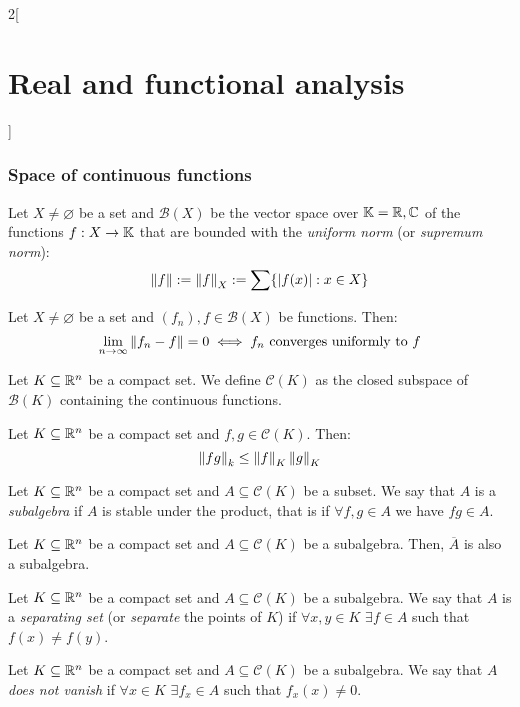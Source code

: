 \documentclass[../../../main_math.tex]{subfiles}
\begin{document}
\begin{multicols}{2}[\section{Real and functional analysis}]
  \subsubsection{Space of continuous functions}
  \begin{definition}
    Let $X\ne \varnothing$ be a set and $\mathcal{B}(X)$ be the vector space over $\mathbb{K}=\mathbb{R},\mathbb{C}$ of the functions $f:X\rightarrow\mathbb{K}$ that are bounded with the \emph{uniform norm} (or \emph{supremum norm}): $$\left\|f\right\|:=\left\|f\right\|_X:=\sum\{\abs{f(x)}:x\in X\}$$
  \end{definition}
  \begin{proposition}
    Let $X\ne \varnothing$ be a set and $(f_n),f\in\mathcal{B}(X)$ be functions. Then: $$\lim_{n\to\infty}\left\|f_n-f\right\|=0\iff f_n\text{ converges uniformly to }f$$
  \end{proposition}
  \begin{definition}
    Let $K\subseteq \mathbb{R}^n$ be a compact set. We define $\mathcal{C}(K)$ as the closed subspace of $\mathcal{B}(K)$ containing the continuous functions.
  \end{definition}
  \begin{proposition}
    Let $K\subseteq \mathbb{R}^n$ be a compact set and $f,g\in\mathcal{C}(K)$. Then: $$\left\|fg\right\|_k\leq\left\|f\right\|_K\left\|g\right\|_K$$
  \end{proposition}
  \begin{definition}
    Let $K\subseteq \mathbb{R}^n$ be a compact set and $A\subseteq \mathcal{C}(K)$ be a subset. We say that $A$ is a \emph{subalgebra} if $A$ is stable under the product, that is if $\forall f,g\in A$ we have $fg\in A$.
  \end{definition}
  \begin{proposition}
    Let $K\subseteq \mathbb{R}^n$ be a compact set and $A\subseteq \mathcal{C}(K)$ be a subalgebra. Then, $\overline{A}$ is also a subalgebra.
  \end{proposition}
  \begin{definition}
    Let $K\subseteq \mathbb{R}^n$ be a compact set and $A\subseteq \mathcal{C}(K)$ be a subalgebra. We say that $A$ is a \emph{separating set} (or \emph{separate} the points of $K$) if $\forall x,y\in K$ $\exists f\in A$ such that $f(x)\ne f(y)$.
  \end{definition}
  \begin{definition}
    Let $K\subseteq \mathbb{R}^n$ be a compact set and $A\subseteq \mathcal{C}(K)$ be a subalgebra. We say that $A$ \emph{does not vanish} if $\forall x\in K$ $\exists f_x\in A$ such that $f_x(x)\ne 0$.
  \end{definition}

\end{multicols}
\end{document}
